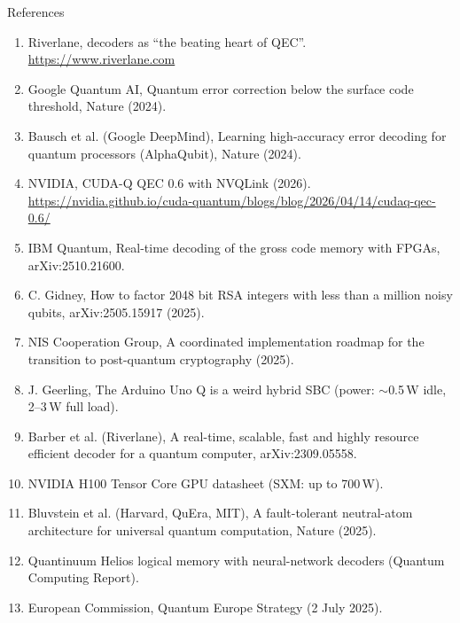 \documentclass[aspectratio=169,11pt]{beamer}
\begin{document}
\begin{frame}[allowframebreaks]{References}
  \tiny
  \begin{enumerate}\setlength\itemsep{0.15em}
    \item Riverlane, decoders as ``the beating heart of QEC''. \url{https://www.riverlane.com}
    \item Google Quantum AI, Quantum error correction below the surface code threshold, Nature (2024).
    \item Bausch et al. (Google DeepMind), Learning high-accuracy error decoding for quantum processors (AlphaQubit), Nature (2024).
    \item NVIDIA, CUDA-Q QEC 0.6 with NVQLink (2026). \url{https://nvidia.github.io/cuda-quantum/blogs/blog/2026/04/14/cudaq-qec-0.6/}
    \item IBM Quantum, Real-time decoding of the gross code memory with FPGAs, arXiv:2510.21600.
    \item C. Gidney, How to factor 2048 bit RSA integers with less than a million noisy qubits, arXiv:2505.15917 (2025).
    \item NIS Cooperation Group, A coordinated implementation roadmap for the transition to post-quantum cryptography (2025).
    \item J. Geerling, The Arduino Uno Q is a weird hybrid SBC (power: $\sim$0.5\,W idle, 2--3\,W full load).
    \item Barber et al. (Riverlane), A real-time, scalable, fast and highly resource efficient decoder for a quantum computer, arXiv:2309.05558.
    \item NVIDIA H100 Tensor Core GPU datasheet (SXM: up to 700\,W).
    \item Bluvstein et al. (Harvard, QuEra, MIT), A fault-tolerant neutral-atom architecture for universal quantum computation, Nature (2025).
    \item Quantinuum Helios logical memory with neural-network decoders (Quantum Computing Report).
    \item European Commission, Quantum Europe Strategy (2 July 2025).
  \end{enumerate}
\end{frame}
\end{document}

